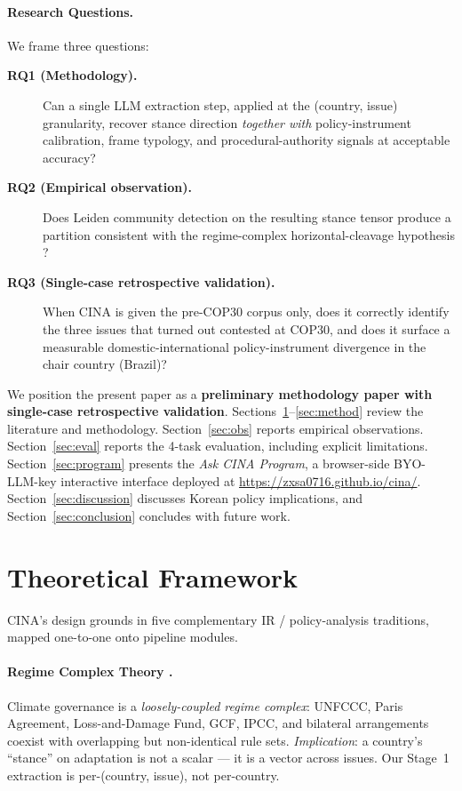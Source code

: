\documentclass[11pt,a4paper]{article}
\begin{document}
\paragraph{Research Questions.} We frame three questions:
\begin{description}
  \item[\textbf{RQ1 (Methodology).}] Can a single LLM extraction step, applied at the (country, issue) granularity, recover stance direction \emph{together with} policy-instrument calibration, frame typology, and procedural-authority signals at acceptable accuracy?
  \item[\textbf{RQ2 (Empirical observation).}] Does Leiden community detection on the resulting stance tensor produce a partition consistent with the regime-complex horizontal-cleavage hypothesis \citep{keohane2011}?
  \item[\textbf{RQ3 (Single-case retrospective validation).}] When CINA is given the pre-COP30 corpus only, does it correctly identify the three issues that turned out contested at COP30, and does it surface a measurable domestic-international policy-instrument divergence in the chair country (Brazil)?
\end{description}

We position the present paper as a \textbf{preliminary methodology paper with single-case retrospective validation}. Sections~\ref{sec:theory}--\ref{sec:method} review the literature and methodology. Section~\ref{sec:obs} reports empirical observations. Section~\ref{sec:eval} reports the 4-task evaluation, including explicit limitations. Section~\ref{sec:program} presents the \emph{Ask CINA Program}, a browser-side BYO-LLM-key interactive interface deployed at \url{https://zxsa0716.github.io/cina/}. Section~\ref{sec:discussion} discusses Korean policy implications, and Section~\ref{sec:conclusion} concludes with future work.

\section{Theoretical Framework}
\label{sec:theory}

CINA's design grounds in five complementary IR / policy-analysis traditions, mapped one-to-one onto pipeline modules.

\paragraph{Regime Complex Theory \citep{keohane2011}.}
Climate governance is a \emph{loosely-coupled regime complex}: UNFCCC, Paris Agreement, Loss-and-Damage Fund, GCF, IPCC, and bilateral arrangements coexist with overlapping but non-identical rule sets. \emph{Implication}: a country's ``stance'' on adaptation is not a scalar --- it is a vector across issues. Our Stage~1 extraction is per-(country, issue), not per-country.
\end{document}
